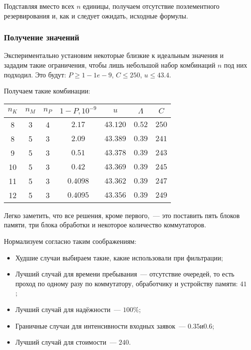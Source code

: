 \documentclass[12pt, a4paper] {ncc}
\begin{document}
Подставляя вместо всех $n$ единицы, получаем отсутствие поэлементного
резервирования и, как и следует ожидать, исходные формулы.

\subsubsection*{Получение значений}

Экспериментально установим некоторые близкие к идеальным значения и зададим
такие ограничения, чтобы лишь небольшой набор комбинаций $n$ под них подходил.
Это будут: $P \ge 1 - 1e-9$, $C \le 250$, $u \le 43.4$.

Получаем такие комбинации:

\begin{tabular}{|c|c|c||c|c|c|c|}
\hline
$n_K$ & $n_M$ & $n_P$ & $1-P, 10^{-9}$ & $u$      & $\Lambda$ & $C$   \\ \hline
\hline
 8    &  3    &  4    & $2.17$         & $43.120$ & $0.52$    & $250$ \\ \hline
 8    &  5    &  3    & $2.09$         & $43.389$ & $0.39$    & $241$ \\ \hline
 9    &  5    &  3    & $0.51$         & $43.378$ & $0.39$    & $243$ \\ \hline
10    &  5    &  3    & $0.42$         & $43.369$ & $0.39$    & $245$ \\ \hline
11    &  5    &  3    & $0.4098$       & $43.362$ & $0.39$    & $247$ \\ \hline
12    &  5    &  3    & $0.4095$       & $43.356$ & $0.39$    & $249$ \\ \hline
\end{tabular}

Легко заметить, что все решения, кроме первого,~--- это поставить пять блоков
памяти, три блока обработки и некоторое количество коммутаторов.

Нормализуем согласно таким соображениям:

\begin{itemize}
\item Худшие случаи выбираем такие, какие использовали при фильтрации;
\item Лучший случай для времени пребывания~--- отсутствие очередей, то есть
проход по одному разу по коммутатору, обработчику и устройству памяти: $41$;
\item Лучший случай для надёжности~--- $100\%$;
\item Граничные случаи для интенсивности входных заявок~--- $0.35 и 0.6$;
\item Лучший случай для стоимости~--- $240$.
\end{itemize}
\end{document}
